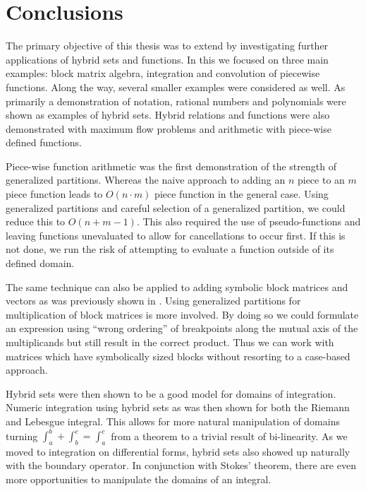 \chapter{Conclusions}
\doublespacing

The primary objective of this thesis was to extend \cite{carette2010} by investigating further applications of hybrid sets and functions. 
In this we focused on three main examples: block matrix algebra, integration and convolution of piecewise functions. 
Along the way, several smaller examples were considered as well.
As primarily a demonstration of notation, rational numbers and polynomials were shown as examples of hybrid sets.
Hybrid relations and functions were also demonstrated with maximum flow problems and arithmetic with piece-wise defined functions.


Piece-wise function arithmetic was the first demonstration of the strength of generalized partitions.
Whereas the naive approach to adding an $n$ piece to an $m$ piece function leads to $O(n\cdot m)$ piece function in the 
general case.
Using generalized partitions and careful selection of a generalized partition, we could reduce this to $O(n+m-1)$.
This also required the use of pseudo-functions and leaving functions unevaluated to allow for cancellations to occur first.
If this is not done, we run the risk of attempting to evaluate a function outside of its defined domain.


The same technique can also be applied to adding symbolic block matrices and vectors as was previously shown in
\cite{carette2010}.
Using generalized partitions for multiplication of block matrices is more involved.
By doing so we could formulate an expression using ``wrong ordering'' of breakpoints along the mutual axis of the
multiplicands but still result in the correct product.
Thus we can work with matrices which have symbolically sized blocks without resorting to a case-based approach. 


Hybrid sets were then shown to be a good model for domains of integration.
Numeric integration using hybrid sets as was then shown for both the Riemann and Lebesgue integral.
This allows for more natural manipulation of domains turning $\int_a^b + \int_b^c = \int_a^c$ from a theorem to 
a trivial result of bi-linearity.
As we moved to integration on differential forms, hybrid sets also showed up naturally with the boundary operator.
In conjunction with Stokes' theorem, there are even more opportunities to manipulate  the domains of an integral.


